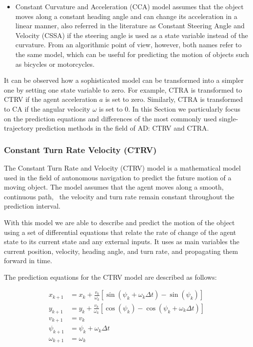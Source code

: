 \begin{itemize}
	\item Constant Curvature and Acceleration (CCA) model assumes that the object moves along a constant heading angle and can change its acceleration in a linear manner, also referred in the literature as Constant Steering Angle and Velocity (CSSA) if the steering angle is used as a state variable instead of the curvature. From an algorithmic point of view, however, both names refer to the same model, which can be useful for predicting the motion of objects such as bicycles or motorcycles.
	
\end{itemize}

It can be observed how a sophisticated model can be transformed into a simpler one by setting one state variable to zero. For example, \ac{CTRA} is transformed to \ac{CTRV} if the agent acceleration $a$ is set to zero. Similarly, \ac{CTRA} is transformed to CA if the angular velocity $\omega$ is set to 0. In this Section we particularly focus on the prediction equations and differences of the most commonly used single-trajectory prediction methods in the field of \ac{AD}: \ac{CTRV} and \ac{CTRA}.

\subsubsection{Constant Turn Rate Velocity (CTRV)}
\label{subsubsec:3_CTRV}

The Constant Turn Rate and Velocity (CTRV) model is a mathematical model used in the field of autonomous navigation to predict the future motion of a moving object. The model assumes that the agent moves along a smooth, continuous path, \ie \ the velocity and turn rate remain constant throughout the prediction interval.

With this model we are able to describe and predict the motion of the object using a set of differential equations that relate the rate of change of the agent state to its current state and any external inputs. It uses as main variables the current position, velocity, heading angle, and turn rate, and propagating them forward in time. %

The prediction equations for the CTRV model are described as follows:

\begin{equation}
\begin{split}
	x_{k+1} &= x_k + \frac{v_k}{\omega_k}\left[\sin(\psi_k+\omega_k\Delta t)-\sin(\psi_k)\right] \\
	y_{k+1} &= y_k + \frac{v_k}{\omega_k}\left[\cos(\psi_k)-\cos(\psi_k+\omega_k\Delta t)\right] \\
	v_{k+1} &= v_k \\
	\psi_{k+1} &= \psi_k + \omega_k\Delta t \\
	\omega_{k+1} &= \omega_k
\end{split}
\end{equation}
	
